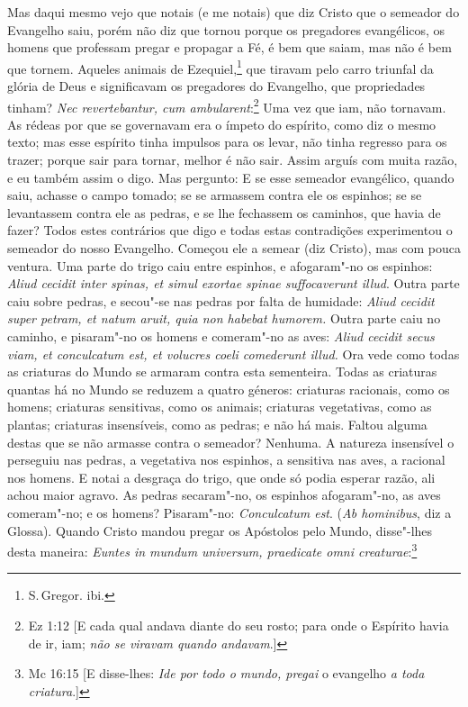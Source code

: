Mas daqui mesmo vejo que notais (e me notais) que diz Cristo que o
semeador do Evangelho saiu, porém não diz que tornou porque os
pregadores evangélicos, os homens que professam pregar e propagar a Fé,
é bem que saiam, mas não é bem que tornem. Aqueles animais de Ezequiel,\footnote{S.\,Gregor. ibi.}
que tiravam pelo carro triunfal da glória de Deus e significavam os
pregadores do Evangelho, que propriedades tinham? \emph{Nec
revertebantur, cum ambularent}:\footnote{Ez 1:12 [E cada qual andava diante do seu rosto; para onde o Espírito havia de ir, iam; \textit{não se viravam quando andavam}.]} Uma vez que iam, não tornavam. As
rédeas por que se governavam era o ímpeto do espírito, como diz o mesmo
texto; mas esse espírito tinha impulsos para os levar, não tinha
regresso para os trazer; porque sair para tornar, melhor é não sair.
Assim arguís com muita razão, e eu também assim o digo. Mas pergunto: E
se esse semeador evangélico, quando saiu, achasse o campo tomado; se se
armassem contra ele os espinhos; se se levantassem contra ele as pedras,
e se lhe fechassem os caminhos, que havia de fazer? Todos estes
contrários que digo e todas estas contradições experimentou o semeador
do nosso Evangelho. Começou ele a semear (diz Cristo), mas com pouca
ventura. Uma parte do trigo caiu entre espinhos, e afogaram"-no os
espinhos: \emph{Aliud cecidit inter spinas, et simul exortae spinae
suffocaverunt illud}. Outra parte caiu sobre pedras, e secou"-se nas
pedras por falta de humidade: \emph{Aliud cecidit super petram, et
natum aruit, quia non habebat humorem.} Outra parte caiu no caminho,
e pisaram"-no os homens e comeram"-no as aves: \emph{Aliud cecidit secus
viam, et conculcatum est, et volucres coeli comederunt illud.} Ora vede
como todas as criaturas do Mundo se armaram contra esta sementeira.
Todas as criaturas quantas há no Mundo se reduzem a quatro géneros: criaturas racionais, como os homens; criaturas sensitivas, como os animais;
criaturas vegetativas, como as plantas; criaturas insensíveis, como as
pedras; e não há mais. Faltou alguma destas que se não armasse contra o
semeador? Nenhuma. A natureza insensível o perseguiu nas pedras, a
vegetativa nos espinhos, a sensitiva nas aves, a racional nos homens.
E notai a desgraça do trigo, que onde só podia esperar razão, ali achou
maior agravo. As pedras secaram"-no, os espinhos afogaram"-no, as aves
comeram"-no; e os homens? Pisaram"-no: \emph{Conculcatum est}. (\emph{Ab
hominibus}, diz a Glossa).
Quando Cristo mandou pregar os Apóstolos pelo Mundo, disse"-lhes desta
maneira: \emph{Euntes in mundum universum, praedicate omni creaturae}:\footnote{Mc 16:15 [E disse-lhes: \textit{Ide por todo o mundo, pregai} o evangelho \textit{a toda criatura}.]}
